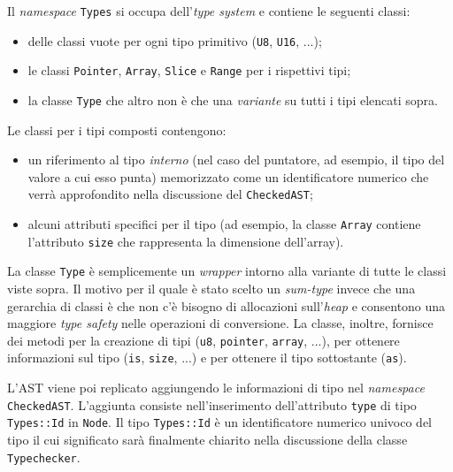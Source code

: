 Il \textit{namespace} \texttt{Types} si occupa dell'\emph{type system} e contiene le seguenti classi:
\begin{itemize}
	\item delle classi vuote per ogni tipo primitivo (\texttt{U8}, \texttt{U16}, ...);
	\item le classi \texttt{Pointer}, \texttt{Array}, \texttt{Slice} e \texttt{Range} per i rispettivi tipi;
	\item la classe \texttt{Type} che altro non \`e che una \textit{variante} su tutti i tipi elencati sopra.
\end{itemize}
Le classi per i tipi composti contengono:
\begin{itemize}
	\item un riferimento al tipo \textit{interno} (nel caso del puntatore, ad esempio, il tipo del valore a cui esso punta) memorizzato come un identificatore numerico che verr\`a approfondito nella discussione del \texttt{CheckedAST};
	\item alcuni attributi specifici per il tipo (ad esempio, la classe \texttt{Array} contiene l'attributo \texttt{size} che rappresenta la dimensione dell'array).
\end{itemize}
La classe \texttt{Type} \`e semplicemente un \textit{wrapper} intorno alla variante di tutte le classi viste sopra. Il motivo per il quale \`e stato scelto un \textit{sum-type} invece che una gerarchia di classi \`e che non c'\`e bisogno di allocazioni sull'\textit{heap} e consentono una maggiore \textit{type safety} nelle operazioni di conversione. La classe, inoltre, fornisce dei metodi per la creazione di tipi (\texttt{u8}, \texttt{pointer}, \texttt{array}, ...), per ottenere informazioni sul tipo (\texttt{is}, \texttt{size}, ...) e per ottenere il tipo sottostante (\texttt{as}).


L'AST viene poi replicato aggiungendo le informazioni di tipo nel \textit{namespace} \texttt{CheckedAST}. L'aggiunta consiste nell'inserimento dell'attributo \texttt{type} di tipo \texttt{Types::Id} in \texttt{Node}. Il tipo \texttt{Types::Id} \`e un identificatore numerico univoco del tipo il cui significato sar\`a finalmente chiarito nella discussione della classe \texttt{Typechecker}.

